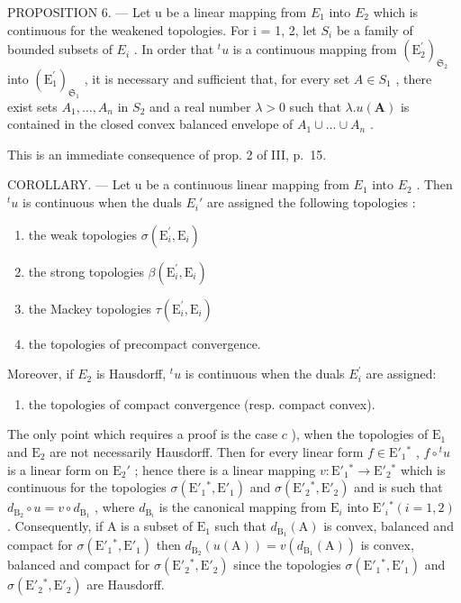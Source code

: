 PROPOSITION 6. --- Let u be a linear mapping from \(E_{1}\) into \(E_{2}\) which is continuous for the weakened topologies. For i = 1, 2, let \(S_{i}\) be a family of bounded subsets of \(E_{i}\) . In order that \(^{t}u\) is a continuous mapping from \((\mathrm{E}_{2}^{\prime})_{\mathfrak{S}_{2}}\) into \((\mathrm{E}_{1}^{\prime})_{\mathfrak{S}_{1}}\) , it is necessary and sufficient that, for every set \(A \in S_{1}\) , there exist sets \(A_{1}, \ldots, A_{n}\) in \(S_{2}\) and a real number \(\lambda > 0\) such that \(\lambda.u(\mathbf{A})\) is contained in the closed convex balanced envelope of \(A_{1} \cup \ldots \cup A_{n}\) .

This is an immediate consequence of prop. 2 of III, p.~15.

COROLLARY. --- Let u be a continuous linear mapping from \(E_{1}\) into \(E_{2}\) . Then \({}^t u\) is continuous when the duals \(E_{i}'\) are assigned the following topologies :

\begin{enumerate}
\def\labelenumi{\alph{enumi})}
\item
  the weak topologies \(\sigma (\mathrm{E}_i^{\prime},\mathrm{E}_i)\)
\item
  the strong topologies \(\beta (\mathrm{E}_i^{\prime},\mathrm{E}_i)\)
\item
  the Mackey topologies \(\tau (\mathrm{E}_i^{\prime},\mathrm{E}_i)\)
\item
  the topologies of precompact convergence.
\end{enumerate}

Moreover, if \(E_{2}\) is Hausdorff, \(^{t}u\) is continuous when the duals \(E_{i}^{\prime}\) are assigned:

\begin{enumerate}
\def\labelenumi{\alph{enumi})}
\setcounter{enumi}{4}
\tightlist
\item
  the topologies of compact convergence (resp. compact convex).
\end{enumerate}

The only point which requires a proof is the case \(c\) ), when the topologies of \(\mathrm{E}_1\) and \(\mathrm{E}_2\) are not necessarily Hausdorff. Then for every linear form \(f \in \mathrm{E}'_1{}^*\) , \(f \circ {}^t u\) is a linear form on \(\mathrm{E}_2'\) ; hence there is a linear mapping \(v: \mathrm{E}'_1{}^* \to \mathrm{E}'_2{}^*\) which is continuous for the topologies \(\sigma(\mathrm{E}'_1{}^*, \mathrm{E}'_1)\) and \(\sigma(\mathrm{E}'_2{}^*, \mathrm{E}'_2)\) and is such that \(d_{\mathrm{B}_2} \circ u = v \circ d_{\mathrm{B}_1}\) , where \(d_{\mathrm{B}_i}\) is the canonical mapping from \(\mathrm{E}_i\) into \(\mathrm{E}'_i{}^* (i = 1, 2)\) . Consequently, if A is a subset of \(\mathrm{E}_1\) such that \(d_{\mathrm{B}_1}(\mathrm{A})\) is convex, balanced and compact for \(\sigma(\mathrm{E}'_1{}^*, \mathrm{E}'_1)\) then \(d_{\mathrm{B}_2}(u(\mathrm{A})) = v(d_{\mathrm{B}_1}(\mathrm{A}))\) is convex, balanced and compact for \(\sigma(\mathrm{E}'_2{}^*, \mathrm{E}'_2)\) since the topologies \(\sigma(\mathrm{E}'_1{}^*, \mathrm{E}'_1)\) and \(\sigma(\mathrm{E}'_2{}^*, \mathrm{E}'_2)\) are Hausdorff.

